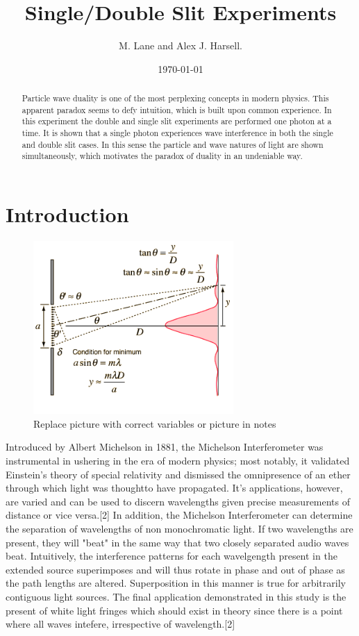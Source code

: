 \documentclass[12pt,twocolumn]{article}
\begin{document}
\title{Single/Double Slit Experiments}
\author{M. Lane and Alex J. Harsell.}
\date{\today}

\maketitle


\begin{abstract}
Particle wave duality is one of the most perplexing concepts in modern physics. This apparent
paradox seems to defy intuition, which is built upon common experience. In this experiment the
double and single slit experiments are performed one photon at a time. It is shown that a single
photon experiences wave interference in both the single and double slit cases. In this sense the
particle and wave natures of light are shown simultaneously, which motivates the paradox of duality
in an undeniable way.
\end{abstract}

\section{Introduction}

\begin{figure}[h!]
	\centering
	\label{fig:eq}
	\includegraphics[width=3in]{images/sinslit.png}
	\caption{Replace picture with correct variables or picture in notes}
\end{figure}
Introduced by Albert Michelson in 1881, the Michelson Interferometer was instrumental in ushering in the era of modern physics; most notably, it validated Einstein's theory of special relativity and dismissed the omnipresence of an ether through which light was thoughtto have propagated. It's applications, however, are varied and can be used to discern wavelengths given precise measurements of distance or vice versa.[2] In addition, the Michelson Interferometer can determine the separation of wavelengths of non monochromatic light. If two wavelengths are present, they will "beat" in the same way that two closely separated audio waves beat. Intuitively, the interference patterns for each wavelgength present in the extended source superimposes and will thus rotate in phase and out of phase as the path lengths are altered.
Superposition in this manner is true for arbitrarily contiguous light sources. The final application demonstrated in this study is the present of white light fringes which should exist in theory since there is a point where all waves intefere, irrespective of wavelength.[2]
\end{document}
